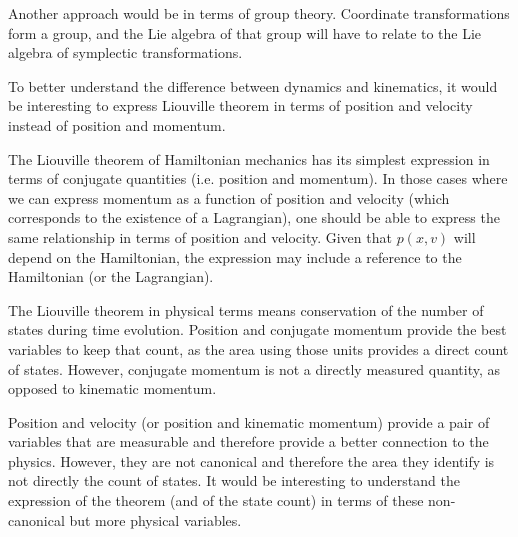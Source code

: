 Another approach would be in terms of group theory. Coordinate transformations form a group, and the Lie algebra of that group will have to relate to the Lie algebra of symplectic transformations.

{To better understand the difference between dynamics and kinematics, it would be interesting to express Liouville theorem in terms of position and velocity instead of position and momentum.}

The Liouville theorem  of Hamiltonian mechanics has its simplest expression in terms of conjugate quantities (i.e. position and momentum). In those cases where we can express momentum as a function of position and velocity (which corresponds to the existence of a Lagrangian), one should be able to express the same relationship in terms of position and velocity. Given that $p(x,v)$ will depend on the Hamiltonian, the expression may include
a reference to the Hamiltonian (or the Lagrangian).

The Liouville theorem in physical terms means conservation of the number of states during time evolution. Position and conjugate momentum provide the best variables to keep that count, as the area using those units provides
a direct count of states. However, conjugate momentum is not a directly measured quantity, as opposed to kinematic momentum.

Position and velocity (or position and kinematic momentum) provide a pair of variables that are measurable and therefore provide a better connection to the physics. However, they are not canonical and therefore the area they identify is not directly the count of states. It would be interesting to understand the expression of the theorem (and of the state count) in terms of these non-canonical but more physical variables.


\fi
